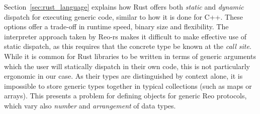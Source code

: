 Section~\ref{sec:rust_language} explains how Rust offers both \textit{static} and \textit{dynamic} dispatch for executing generic code, similar to how it is done for C++. These options offer a trade-off in runtime speed, binary size and flexibility. The interpreter approach taken by Reo-rs makes it difficult to make effective use of static dispatch, as this requires that the concrete type be known at the \textit{call site}. While it is common for Rust libraries to be written in terms of generic arguments which the user will statically dispatch in their own code, this is not particularly ergonomic in our case. As their types are distinguished by context alone, it is impossible to store generic types together in typical collections (such as maps or arrays). This presents a problem for defining objects for generic Reo protocols, which vary also \textit{number} and \textit{arrangement} of data types. 

